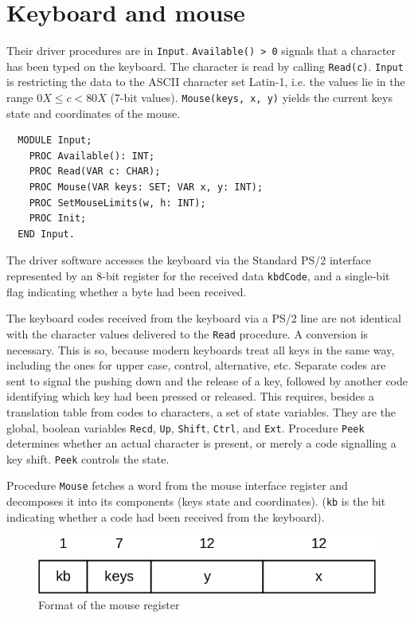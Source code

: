 \section{Keyboard and mouse}
\label{sec:kbm}
Their driver procedures are in \verb|Input|. \verb|Available() > 0| signals that a
character has been typed on the keyboard. The character is read by calling \verb|Read(c)|.
\verb|Input| is restricting the data to the ASCII character set Latin-1, i.e. the values
lie in the range $0X \le c < 80X$ (7-bit values). \verb|Mouse(keys, x, y)| yields the
current keys state and coordinates of the mouse.
\begin{verbatim}
  MODULE Input;
    PROC Available(): INT;
    PROC Read(VAR c: CHAR);
    PROC Mouse(VAR keys: SET; VAR x, y: INT);
    PROC SetMouseLimits(w, h: INT);
    PROC Init;
  END Input.
\end{verbatim}
The driver software accesses the keyboard via the Standard PS/2 interface represented by
an 8-bit register for the received data \verb|kbdCode|, and a single-bit flag indicating
whether a byte had been received.

The keyboard codes received from the keyboard via a PS/2 line are not identical with the
character values delivered to the \verb|Read| procedure. A conversion is necessary. This
is so, because modern keyboards treat all keys in the same way, including the ones for
upper case, control, alternative, etc. Separate codes are sent to signal the pushing down
and the release of a key, followed by another code identifying which key had been pressed
or released. This requires, besides a translation table from codes to characters, a set of
state variables. They are the global, boolean variables \verb|Recd|, \verb|Up|, \verb|Shift|,
\verb|Ctrl|, and \verb|Ext|. Procedure \verb|Peek| determines whether an actual character
is present, or merely a code signalling a key shift. \verb|Peek| controls the state.

Procedure \verb|Mouse| fetches a word from the mouse interface register and decomposes it
into its components (keys state and coordinates). (\verb|kb| is the bit indicating whether
a code had been received from the keyboard).
\begin{figure}[h!]
  \label{fig:format}
  \centering
  \includegraphics[width=.75\textwidth]{i/z}
  \caption{Format of the mouse register}
\end{figure}

